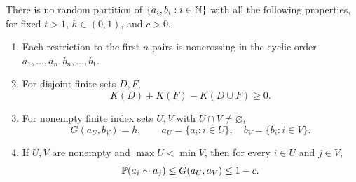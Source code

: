 \begin{lemma}\label{lem:sector:paired-lists}
There is no random partition of
$\{a_i,b_i:i\in\mathbb N\}$ with all the following properties, for fixed
$t>1$, $h\in(0,1)$, and $c>0$.
\begin{enumerate}[label=\textup{(\roman*)}]
\item Each restriction to the first $n$ pairs is noncrossing in the
cyclic order $a_1,\ldots,a_n,b_n,\ldots,b_1$.
\item For disjoint finite sets $D,F$,
\begin{equation}\label{sector:partition-pressure}
 K(D)+K(F)-K(D\cup F)\geq0.
\end{equation}
\item For nonempty finite index sets $U,V$ with $U\cap V\ne\varnothing$,
\begin{equation}\label{sector:matched-tests}
 G(a_U,b_V)=h,
 \qquad a_U=\{a_i:i\in U\},\quad b_V=\{b_i:i\in V\}.
\end{equation}
\item If $U,V$ are nonempty and $\max U<\min V$, then for every
$i\in U$ and $j\in V$,
\begin{equation}\label{sector:same-side-tests}
 \mathbb P(a_i\sim a_j)\leq G(a_U,a_V)\leq1-c.
\end{equation}
\end{enumerate}
\end{lemma}

